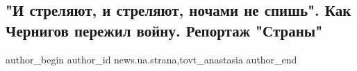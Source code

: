  
 
 
 
 
 
\subsection{"И стреляют, и стреляют, ночами не спишь". Как Чернигов пережил войну. Репортаж "Страны"}
\label{sec:17_04_2022.stz.news.ua.strana.1.chernigov}
 
\ifcmt
 author_begin
   author_id news.ua.strana,tovt_anastasia
 author_end
\fi
